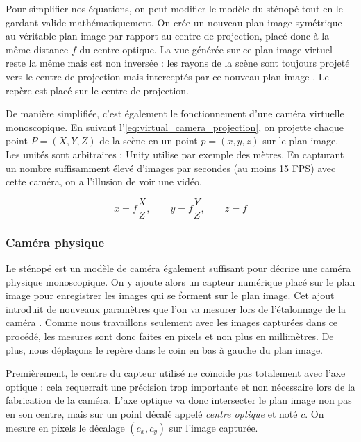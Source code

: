 Pour simplifier nos équations, on peut modifier le modèle du sténopé tout en le gardant valide mathématiquement. On crée un nouveau plan image symétrique au véritable plan image par rapport au centre de projection, placé donc à la même distance $f$ du centre optique. La vue générée sur ce plan image virtuel reste la même mais est non inversée : les rayons de la scène sont toujours projeté vers le centre de projection mais interceptés par ce nouveau plan image . Le repère est placé sur le centre de projection.


De manière simplifiée, c'est également le fonctionnement d'une caméra virtuelle monoscopique. En suivant l'\autoref{eq:virtual_camera_projection}, on projette chaque point $P=(X,Y,Z)$ de la scène en un point $p=(x,y,z)$ sur le plan image. Les unités sont arbitraires ; Unity utilise par exemple des mètres. En capturant un nombre suffisamment élevé d'images par secondes (au moins 15 FPS) avec cette caméra, on a l'illusion de voir une vidéo.

\begin{equation}
  \label{eq:virtual_camera_projection}
  x = f \frac{X}{Z},\qquad y = f \frac{Y}{Z},\qquad z = f
\end{equation}

\subsubsection{Caméra physique}
Le sténopé est un modèle de caméra également suffisant pour décrire une caméra physique monoscopique. On y ajoute alors un capteur numérique placé sur le plan image pour enregistrer les images qui se forment sur le plan image. Cet ajout introduit de nouveaux paramètres que l'on va mesurer lors de l'étalonnage de la caméra . Comme nous travaillons seulement avec les images capturées dans ce procédé, les mesures sont donc faites en pixels et non plus en millimètres. De plus, nous déplaçons le repère dans le coin en bas à gauche du plan image.

Premièrement, le centre du capteur utilisé ne coïncide pas totalement avec l'axe optique : cela requerrait une précision trop importante et non nécessaire lors de la fabrication de la caméra. L'axe optique va donc intersecter le plan image non pas en son centre, mais sur un point décalé appelé \emph{centre optique} et noté $c$. On mesure en pixels le décalage $(c_x,c_y)$ sur l'image capturée.

